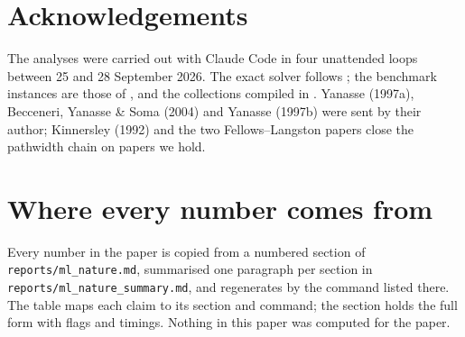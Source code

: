 \documentclass[11pt,a4paper]{article}
\newcommand{\code}[1]{\texttt{#1}}
\begin{document}
\section*{Acknowledgements}
The analyses were carried out with Claude Code in four unattended loops
between 25 and 28 September 2026. The exact solver follows
\citet{ChuStuckey2009}; the benchmark instances are those of
\citet{ChuStuckey2009}, \citet{FaggioliBentivoglio1998} and the collections
compiled in \citet{Frinhani2018}. Yanasse (1997a), Becceneri, Yanasse \& Soma
(2004) and Yanasse (1997b) were sent by their author; Kinnersley (1992) and the
two Fellows--Langston papers close the pathwidth chain on papers we hold.




\appendix

\section{Where every number comes from}
\label{app:provenance}

Every number in the paper is copied from a numbered section of
\code{reports/ml\_nature.md}, summarised one paragraph per section in
\code{reports/ml\_nature\_summary.md}, and regenerates by the command listed
there. The table maps each claim to its section and command; the section
holds the full form with flags and timings. Nothing in this paper was
computed for the paper.
\end{document}
